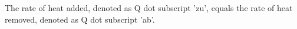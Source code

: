 The rate of heat added, denoted as Q dot subscript 'zu', equals the rate of heat removed, denoted as Q dot subscript 'ab'.
